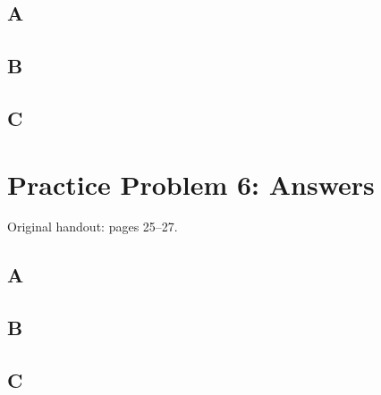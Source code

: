 \documentclass[letterpaper,12pt]{article}
\newcommand{\handout}[1]{%
  
}
\newenvironment{answer}{\par}{\par\medskip}
\begin{document}
\subsection*{A}
\begin{answer}
  \vspace{2cm}
\end{answer}

\subsection*{B}
\begin{answer}
  \vspace{2cm}
\end{answer}

\subsection*{C}
\begin{answer}
  \vspace{2cm}
\end{answer}

\clearpage

\handout{25-27}
\section*{Practice Problem 6: Answers}
\noindent Original handout: pages 25--27.\par

\subsection*{A}
\begin{answer}
  \vspace{2cm}
\end{answer}

\subsection*{B}
\begin{answer}
  \vspace{2cm}
\end{answer}

\subsection*{C}
\begin{answer}
  \vspace{2cm}
\end{answer}
\end{document}
